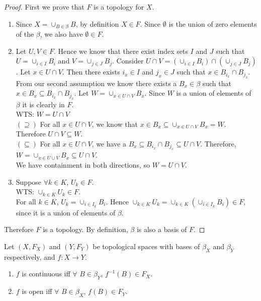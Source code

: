 \begin{proof}
	First we prove that $F$ is a topology for $X$. 
	\begin{enumerate}
		\item Since $X = \displaystyle{\cup_{B \in \beta} B}$, by definition $X \in F$. Since $\emptyset$ is the union of zero elements of the $\beta$, we also have $\emptyset \in F$. 
		\item Let $U, V \in F$. Hence we know that there exist index sets $I$ and $J$ such that $U = \cup_{i \in I}B_i$ and $V = \cup_{j \in J}B_j$. Consider $U \cap V = ( \cup_{i \in I}B_i) \cap (\cup_{j \in J}B_j)$. Let $x \in U \cap V$. Then there exists $i_x \in I$ and $j_x \in J$ such that $x \in B_{i_x} \cap B_{j_x}$. From our second assumption we know there exists a $B_x \in \beta$ such that $x \in B_x \subseteq B_{i_x} \cap B_{j_x}$. Let $W = \cup_{x \in U \cap V} B_x$. Since $W$ is a union of elements of $\beta$ it is clearly in $F$. \\
		WTS: $W = U \cap V$\\
		$(\supseteq)$ For all $x \in U \cap V$, we know that $x \in B_x \subseteq \cup_{x \in U \cap V}B_x = W$. Therefore $U \cap V \subseteq W$. \\
		$(\subseteq)$ For all $x \in U \cap V$, we have a $B_x \subseteq B_{i_x} \cap B_{j_x} \subseteq U \cap V$. Therefore, $W = \cup_{x \in U \cup V} B_x \subseteq U \cap V$.\\
		We have containment in both directions, so $W = U \cap V$. 
		\item Suppose $\forall k \in K$, $U_k \in F$. \\
		WTS: $\cup_{k \in K}U_k \in F$. \\
		For all $k \in K$, $U_k = \cup_{i \in I_k} B_i$. Hence $\cup_{k \in K}U_k = \cup_{k \in K} (\cup_{i \in I_k} B_i) \in F$, since it is a union of elements of $\beta$. 
	\end{enumerate}
	Therefore $F$ is a topology. By definition, $\beta$ is also a basis of $F$. 
\end{proof}
\begin{smallfact}
	Let $(X, F_X)$ and $(Y, F_Y)$ be topological spaces with bases of $\beta_X$ and $\beta_Y$ respectively, and $f: X \to Y$. 
	\begin{enumerate}
		\item $f$ is continuous iff $\forall$ $B \in \beta_Y$, $f^{-1}(B) \in F_X$. 
		\item $f$ is open iff $\forall$ $B \in \beta_X$, $f(B) \in F_Y$. 
	\end{enumerate}
\end{smallfact}
